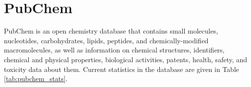 \section{PubChem}
PubChem is an open chemistry database that contains small molecules, nucleotides, carbohydrates, lipids, peptides, and chemically-modified macromolecules, as well as information on chemical structures, identifiers, chemical and physical properties, biological activities, patents, health, safety, and toxicity data about them. Current statistics in the database are given in Table \ref{tab:pubchem_stats}.



 